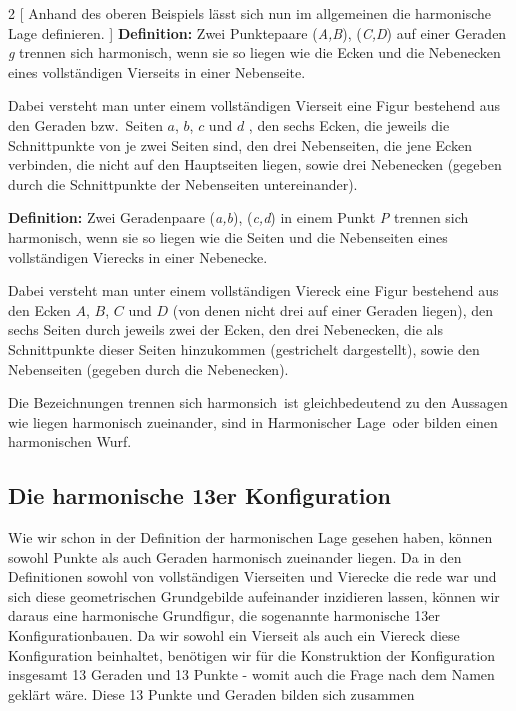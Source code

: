 \documentclass[12pt,a4paper]{article}
\begin{document}
\begin{multicols}{2}
[
Anhand des oberen Beispiels lässt sich nun im allgemeinen die harmonische Lage definieren.
]
\textbf{Definition:} Zwei Punktepaare (\textit{A,B}), (\textit{C,D}) auf einer Geraden \textit{g} \glqq trennen sich harmonisch\grqq , wenn sie so liegen wie die Ecken und die Nebenecken eines vollständigen Vierseits in einer Nebenseite.

Dabei versteht man unter einem vollständigen Vierseit eine Figur bestehend aus den Geraden bzw.~Seiten $a$, $b$, $c$ und $d$ , den sechs Ecken, die jeweils die Schnittpunkte von je zwei Seiten sind, den drei Nebenseiten, die jene Ecken verbinden, die nicht auf den Hauptseiten liegen, sowie drei Nebenecken (gegeben durch die Schnittpunkte der Nebenseiten untereinander).

\columnbreak
\textbf{Definition:} Zwei Geradenpaare (\textit{a,b}), (\textit{c,d}) in einem Punkt \textit{P} \glqq trennen sich harmonisch\grqq , wenn sie so liegen wie die Seiten und die Nebenseiten eines vollständigen Vierecks in einer Nebenecke.

Dabei versteht man unter einem vollständigen Viereck eine Figur bestehend aus den Ecken $A$, $B$, $C$ und $D$ (von denen nicht drei auf einer Geraden liegen), den sechs Seiten durch jeweils zwei der Ecken, den drei Nebenecken, die als Schnittpunkte dieser Seiten hinzukommen (gestrichelt dargestellt), sowie den Nebenseiten (gegeben durch die Nebenecken).
\end{multicols}

Die Bezeichnungen \glqq trennen sich harmonsich\grqq ~ist gleichbedeutend zu den Aussagen wie \glqq liegen harmonisch zueinander\grqq , \glqq sind in Harmonischer Lage\grqq ~oder \glqq bilden einen harmonischen Wurf\grqq .

\subsection{Die harmonische 13er Konfiguration}
\label{subsec:harmonischeKonfiguration}

Wie wir schon in der Definition der harmonischen Lage gesehen haben, können sowohl Punkte als auch Geraden harmonisch zueinander liegen. Da in den Definitionen sowohl von vollständigen Vierseiten und Vierecke die rede war und sich diese geometrischen Grundgebilde aufeinander inzidieren lassen, können wir daraus eine harmonische Grundfigur, die sogenannte \glqq harmonische 13er Konfiguration\grqq bauen. Da wir sowohl ein Vierseit als auch ein Viereck diese Konfiguration beinhaltet, benötigen wir für die Konstruktion der Konfiguration insgesamt 13 Geraden und 13 Punkte - womit auch die Frage nach dem Namen geklärt wäre. Diese 13 Punkte und Geraden bilden sich zusammen
\end{document}
